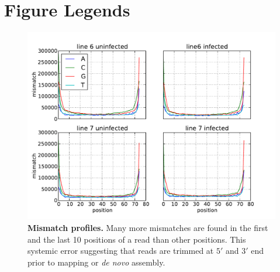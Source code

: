 \documentclass[10pt]{article}
\begin{document}



%

\section*{Figure Legends}
\begin{figure}[!ht]
\begin{center}
\includegraphics[width=6in]{reads_error_profiles_legend.pdf}
\end{center}
\caption{
{\bf Mismatch profiles.} Many more mismatches are found in the first and the
last 10 positions of a read than other positions.
This systemic error suggesting that reads are trimmed at $5'$ and $3'$ end
prior to mapping or \emph{de novo} assembly.
}
\label{Figure_label}
\end{figure}
\end{document}
